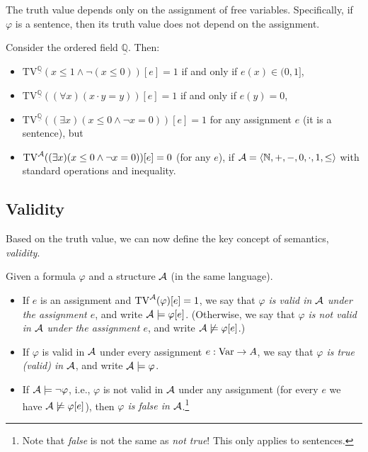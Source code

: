 \begin{remark}
    The truth value depends only on the assignment of free variables. Specifically, if $\varphi$ is a sentence, then its truth value does not depend on the assignment.
\end{remark}

\begin{example}
Consider the ordered field $\underline{\mathbb Q}$. Then:
\begin{itemize}
    \item $\mathrm{TV}^{\underline{\mathbb Q}}(x\leq 1 \land \neg (x\leq 0))[e]=1$ if and only if $e(x)\in (0,1]$,
    \item $\mathrm{TV}^{\underline{\mathbb Q}}((\forall x)(x\cdot y = y))[e]=1$ if and only if $e(y)=0$,
    \item $\mathrm{TV}^{\underline{\mathbb Q}}((\exists x)(x \leq 0 \land \neg x=0))[e]=1$ for any assignment $e$ (it is a sentence), but 
    \item $\mathrm{TV}^{\mathcal{A}}((\exists x)(x \leq 0 \land \neg x=0))[e]=0$ (for any $e$), if $\mathcal{A}=\langle \mathbb N,+,-,0,\cdot,1,\leq\rangle$ with standard operations and inequality.
\end{itemize}    
\end{example}

\subsection{Validity}

Based on the truth value, we can now define the key concept of semantics, \emph{validity}.

\begin{definition}
Given a formula $\varphi$ and a structure $\mathcal{A}$ (in the same language). 
\begin{itemize}
    \item If $e$ is an assignment and $\mathrm{TV}^{\mathcal{A}}(\varphi)[e]=1$, we say that \emph{$\varphi$ is valid in $\mathcal{A}$ under the assignment $e$}, and write $\mathcal{A}\models\varphi[e]$. (Otherwise, we say that \emph{$\varphi$ is not valid in $\mathcal{A}$ under the assignment $e$}, and write $\mathcal{A}\not\models\varphi[e]$.)
    \item If $\varphi$ is valid in $\mathcal{A}$ under every assignment $e:\operatorname{Var}\to A$, we say that \emph{$\varphi$ is true (valid) in $\mathcal{A}$}, and write $\mathcal{A}\models\varphi$.
    \item If $\mathcal{A}\models\neg\varphi$, i.e., $\varphi$ is not valid in $\mathcal{A}$ under any assignment (for every $e$ we have $\mathcal{A}\not\models\varphi[e]$), then \emph{$\varphi$ is false in $\mathcal{A}$}.\footnote{Note that \emph{false} is not the same as \emph{not true}! This only applies to sentences.}
\end{itemize}    
\end{definition}

